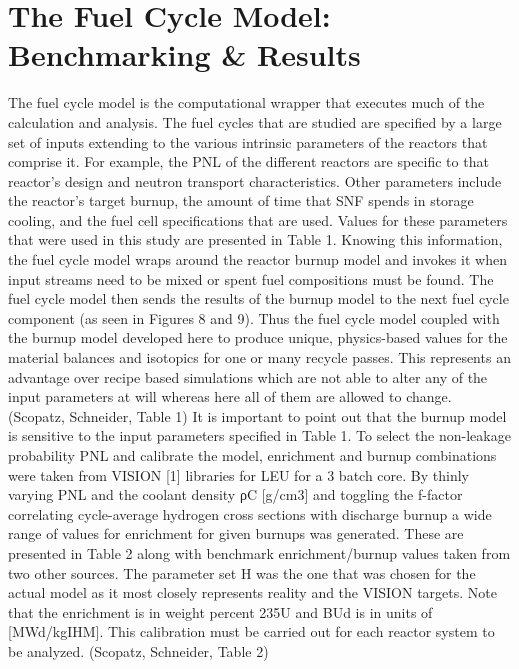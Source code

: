 \section{The Fuel Cycle Model: Benchmarking \& Results}
\label{1g_sec:fcmodel_benchmark}
The fuel cycle model is the computational wrapper that executes much of the calculation and analysis.  The fuel cycles that are studied are specified by a large set of inputs extending to the various intrinsic parameters of the reactors that comprise it.  For example, the PNL of the different reactors are specific to that reactor’s design and neutron transport characteristics.  Other parameters include the reactor’s target burnup, the amount of time that SNF spends in storage cooling, and the fuel cell specifications that are used.  Values for these parameters that were used in this study are presented in Table 1.  Knowing this information, the fuel cycle model wraps around the reactor burnup model and invokes it when input streams need to be mixed or spent fuel compositions must be found.  The fuel cycle model then sends the results of the burnup model to the next fuel cycle component (as seen in Figures 8 and 9).  Thus the fuel cycle model coupled with the burnup model developed here to produce unique, physics-based values for the material balances and isotopics for one or many recycle passes.  This represents an advantage over recipe based simulations which are not able to alter any of the input parameters at will whereas here all of them are allowed to change. 
(Scopatz, Schneider, Table 1)
It is important to point out that the burnup model is sensitive to the input parameters specified in Table 1.  To select the non-leakage probability PNL and calibrate the model, enrichment and burnup combinations were taken from VISION [1] libraries for LEU for a 3 batch core.  By thinly varying PNL and the coolant density ρC [g/cm3] and toggling the f-factor correlating cycle-average hydrogen cross sections with discharge burnup a wide range of values for enrichment for given burnups was generated.  These are presented in Table 2 along with benchmark enrichment/burnup values taken from two other sources.  The parameter set H was the one that was chosen for the actual model as it most closely represents reality and the VISION targets.  Note that the enrichment is in weight percent 235U and BUd is in units of [MWd/kgIHM].  This calibration must be carried out for each reactor system to be analyzed.
(Scopatz, Schneider, Table 2)
